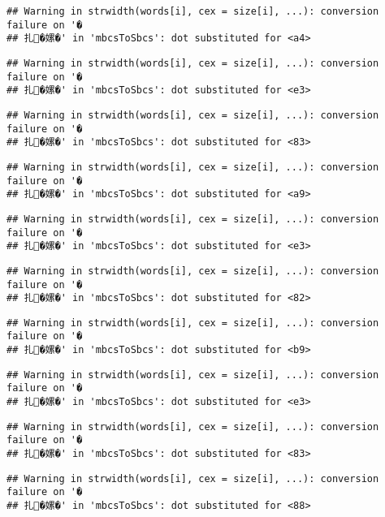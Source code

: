 \documentclass[]{article}
\begin{document}
\begin{verbatim}
## Warning in strwidth(words[i], cex = size[i], ...): conversion failure on '�
## 扎�嫘�' in 'mbcsToSbcs': dot substituted for <a4>
\end{verbatim}

\begin{verbatim}
## Warning in strwidth(words[i], cex = size[i], ...): conversion failure on '�
## 扎�嫘�' in 'mbcsToSbcs': dot substituted for <e3>
\end{verbatim}

\begin{verbatim}
## Warning in strwidth(words[i], cex = size[i], ...): conversion failure on '�
## 扎�嫘�' in 'mbcsToSbcs': dot substituted for <83>
\end{verbatim}

\begin{verbatim}
## Warning in strwidth(words[i], cex = size[i], ...): conversion failure on '�
## 扎�嫘�' in 'mbcsToSbcs': dot substituted for <a9>
\end{verbatim}

\begin{verbatim}
## Warning in strwidth(words[i], cex = size[i], ...): conversion failure on '�
## 扎�嫘�' in 'mbcsToSbcs': dot substituted for <e3>
\end{verbatim}

\begin{verbatim}
## Warning in strwidth(words[i], cex = size[i], ...): conversion failure on '�
## 扎�嫘�' in 'mbcsToSbcs': dot substituted for <82>
\end{verbatim}

\begin{verbatim}
## Warning in strwidth(words[i], cex = size[i], ...): conversion failure on '�
## 扎�嫘�' in 'mbcsToSbcs': dot substituted for <b9>
\end{verbatim}

\begin{verbatim}
## Warning in strwidth(words[i], cex = size[i], ...): conversion failure on '�
## 扎�嫘�' in 'mbcsToSbcs': dot substituted for <e3>
\end{verbatim}

\begin{verbatim}
## Warning in strwidth(words[i], cex = size[i], ...): conversion failure on '�
## 扎�嫘�' in 'mbcsToSbcs': dot substituted for <83>
\end{verbatim}

\begin{verbatim}
## Warning in strwidth(words[i], cex = size[i], ...): conversion failure on '�
## 扎�嫘�' in 'mbcsToSbcs': dot substituted for <88>
\end{verbatim}
\end{document}
